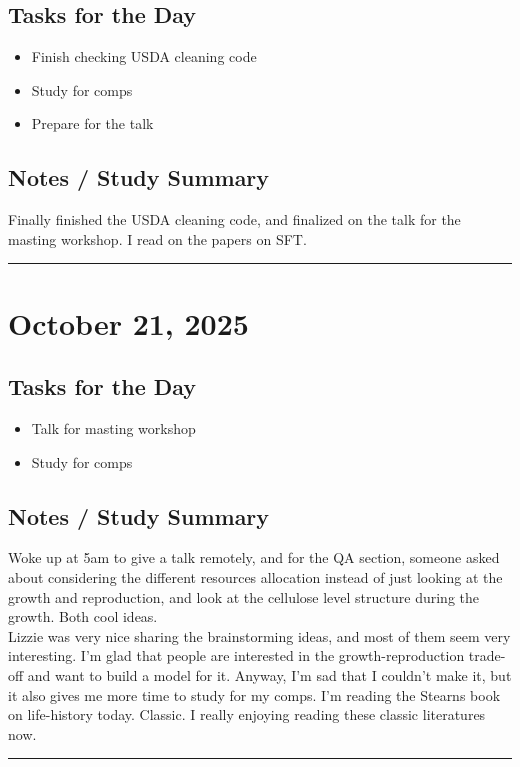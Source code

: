 \documentclass[12pt]{article}
\begin{document}
\subsection*{Tasks for the Day}
\begin{itemize}
    \item Finish checking USDA cleaning code
    \item Study for comps
    \item Prepare for the talk
\end{itemize}
\subsection*{Notes / Study Summary}
Finally finished the USDA cleaning code, and finalized on the talk for the masting workshop. I read on the papers on SFT.
\vspace{1em}
\hrule
\vspace{1em}
\section*{October 21, 2025}

\subsection*{Tasks for the Day}
\begin{itemize}
    \item Talk for masting workshop
    \item Study for comps
\end{itemize}
\subsection*{Notes / Study Summary}
Woke up at 5am to give a talk remotely, and for the QA section, someone asked about considering the different resources allocation instead of just looking at the growth and reproduction, and look at the cellulose level structure during the growth. Both cool ideas.\\Lizzie was very nice sharing the brainstorming ideas, and most of them seem very interesting. I'm glad that people are interested in the growth-reproduction trade-off and want to build a model for it. Anyway, I'm sad that I couldn't make it, but it also gives me more time to study for my comps. I'm reading the Stearns book on life-history today. Classic. I really enjoying reading these classic literatures now.
\vspace{1em}
\hrule
\vspace{1em}
\end{document}
